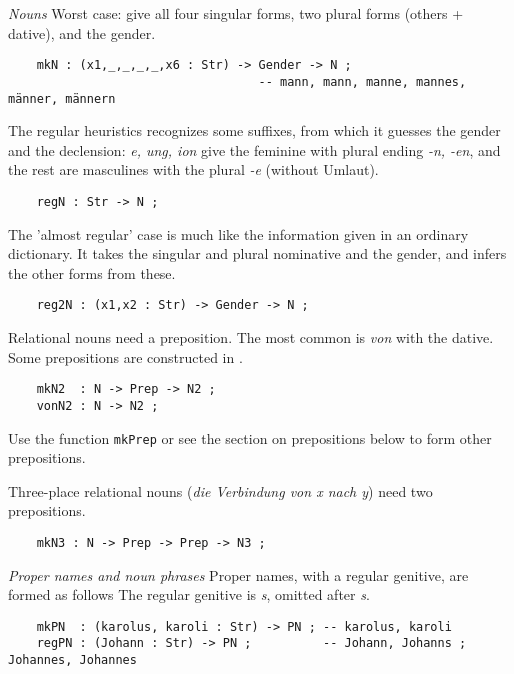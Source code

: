 \documentclass[11pt,a4paper]{article}
\newcommand{\subsubsubsection}[1]{\textit{#1}}
\begin{document}
\subsubsubsection{Nouns}
Worst case: give all four singular forms, two plural forms (others + dative),
and the gender.

\begin{verbatim}
    mkN : (x1,_,_,_,_,x6 : Str) -> Gender -> N ; 
                                   -- mann, mann, manne, mannes, männer, männern
\end{verbatim}

The regular heuristics recognizes some suffixes, from which it
guesses the gender and the declension: \textit{e, ung, ion} give the
feminine with plural ending \textit{-n, -en}, and the rest are masculines
with the plural \textit{-e} (without Umlaut).

\begin{verbatim}
    regN : Str -> N ;
\end{verbatim}

The 'almost regular' case is much like the information given in an ordinary
dictionary. It takes the singular and plural nominative and the
gender, and infers the other forms from these.

\begin{verbatim}
    reg2N : (x1,x2 : Str) -> Gender -> N ;
\end{verbatim}

Relational nouns need a preposition. The most common is \textit{von} with
the dative. Some prepositions are constructed in .

\begin{verbatim}
    mkN2  : N -> Prep -> N2 ;
    vonN2 : N -> N2 ;
\end{verbatim}

Use the function \texttt{mkPrep} or see the section on prepositions below to  
form other prepositions.

Three-place relational nouns (\textit{die Verbindung von x nach y}) need two prepositions.

\begin{verbatim}
    mkN3 : N -> Prep -> Prep -> N3 ;
\end{verbatim}

\subsubsubsection{Proper names and noun phrases}
Proper names, with a regular genitive, are formed as follows
The regular genitive is  \textit{s}, omitted after \textit{s}.

\begin{verbatim}
    mkPN  : (karolus, karoli : Str) -> PN ; -- karolus, karoli
    regPN : (Johann : Str) -> PN ;          -- Johann, Johanns ; Johannes, Johannes
\end{verbatim}
\end{document}
